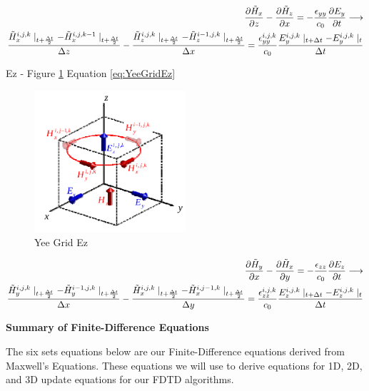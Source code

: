 \documentclass[a4paper,10pt]{article}
\begin{document}
\begin{align}
  \label{eq:YeeGridEy}
  \frac{\partial \tilde{H}_x}{\partial z} - \frac{\partial \tilde{H}_z}{\partial x} = -\frac{\epsilon_{yy}}{c_0}\frac{\partial E_y}{\partial t}
  \longrightarrow\\
  \frac{\tilde{H}_{x}^{i,j,k}\mid_{t+\frac{\Delta t}{2}} - \tilde{H}_{x}^{i,j,k-1}\mid_{t+\frac  {\Delta t}{2}}}{\Delta z} - \frac{\tilde{H}_{z}^{i,j,k}\mid_{t+\frac  {\Delta t}{2}} - \tilde{H}_{z}^{i-1,j,k}\mid_{t+\frac  {\Delta t}{2}}}{\Delta x} = \frac{\epsilon_{yy}^{i,j,k}}{c_0} \frac{E_{y}^{i,j,k}\mid_{t+\Delta t} - E_{y}^{i,j,k}\mid_{t}}{\Delta t}\notag
\end{align}


Ez - Figure \ref{fig:YeeGridEz} Equation \eqref{eq:YeeGridEz} 

\begin{figure}[h]
  \centering
    \includegraphics[width=0.5\textwidth]{YeeGridEz.png}
  \caption{Yee Grid Ez}
  \label{fig:YeeGridEz}
\end{figure}

\begin{align}
  \label{eq:YeeGridEz}
  \frac{\partial \tilde{H}_y}{\partial x} - \frac{\partial \tilde{H}_x}{\partial y} = -\frac{\epsilon_{zz}}{c_0}\frac{\partial E_z}{\partial t}
  \longrightarrow\\
  \frac{\tilde{H}_{y}^{i,j,k}\mid_{t+\frac{\Delta t}{2}} - \tilde{H}_{y}^{i-1,j,k}\mid_{t+\frac  {\Delta t}{2}}}{\Delta x} - \frac{\tilde{H}_{x}^{i,j,k}\mid_{t+\frac  {\Delta t}{2}} - \tilde{H}_{x}^{i,j-1,k}\mid_{t+\frac  {\Delta t}{2}}}{\Delta y} = \frac{\epsilon_{zz}^{i,j,k}}{c_0} \frac{E_{z}^{i,j,k}\mid_{t+\Delta t} - E_{z}^{i,j,k}\mid_{t}}{\Delta t}\notag
\end{align}


\textbf{Summary of Finite-Difference Equations}

The six sets equations below are our Finite-Difference equations derived from Maxwell's Equations.  These equations we will use to derive equations for 1D, 2D, and 3D update equations for our FDTD algorithms.
\end{document}
